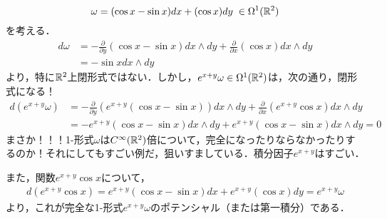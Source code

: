 \documentclass[uplatex,dvipdfmx]{jsreport}
\begin{document}
\begin{example}[或る積分因子について完全になる1-形式]
    \[ \omega=(\cos x-\sin x)dx + (\cos x)dy\;\in\Omega^1(\mathbb{R}^2) \]
    を考える．
    \begin{align*}
        d\omega &= -\frac{\partial}{\partial y}(\cos x-\sin x)dx\wedge dy + \frac{\partial}{\partial x}(\cos x)dx\wedge dy\\
        &= -\sin xdx\wedge dy
    \end{align*}
    より，特に$\mathbb{R}^2$上閉形式ではない．しかし，$e^{x+y}\omega\in\Omega^1(\mathbb{R}^2)$は，次の通り，閉形式になる！
    \begin{align*}
        d(e^{x+y}\omega) &= -\frac{\partial}{\partial y}(e^{x+y}(\cos x-\sin x))dx\wedge dy + \frac{\partial}{\partial x}(e^{x+y}\cos x)dx\wedge dy\\
        &= -e^{x+y}(\cos x-\sin x)dx\wedge dy + e^{x+y}(\cos x-\sin x)dx\wedge dy = 0
    \end{align*}
    まさか！！！1-形式$\omega$は$C^\infty(\mathbb{R}^2)$倍について，完全になったりならなかったりするのか！それにしてもすごい例だ，狙いすましている．積分因子$e^{x+y}$はすごい．

    また，関数$e^{x+y}\cos x$について，
    \begin{align*}
        d(e^{x+y}\cos x) = e^{x+y}(\cos x-\sin x)dx + e^{x+y}(\cos x)dy = e^{x+y}\omega
    \end{align*}
    より，これが完全な1-形式$e^{x+y}\omega$のポテンシャル（または第一積分）である．
\end{example}
\end{document}
